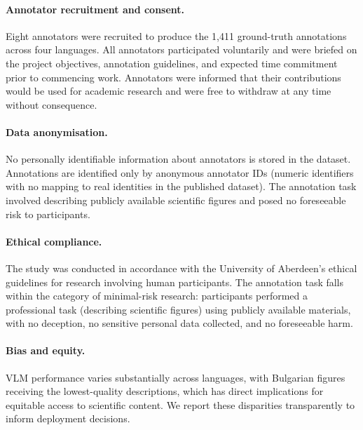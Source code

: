 \paragraph{Annotator recruitment and consent.}
Eight annotators were recruited to produce the 1,411 ground-truth annotations across four languages. All annotators participated voluntarily and were briefed on the project objectives, annotation guidelines, and expected time commitment prior to commencing work. Annotators were informed that their contributions would be used for academic research and were free to withdraw at any time without consequence.

\paragraph{Data anonymisation.}
No personally identifiable information about annotators is stored in the dataset. Annotations are identified only by anonymous annotator IDs (numeric identifiers with no mapping to real identities in the published dataset). The annotation task involved describing publicly available scientific figures and posed no foreseeable risk to participants.

\paragraph{Ethical compliance.}
The study was conducted in accordance with the University of Aberdeen's ethical guidelines for research involving human participants. The annotation task falls within the category of minimal-risk research: participants performed a professional task (describing scientific figures) using publicly available materials, with no deception, no sensitive personal data collected, and no foreseeable harm.

\paragraph{Bias and equity.}
VLM performance varies substantially across languages, with Bulgarian figures receiving the lowest-quality descriptions, which has direct implications for equitable access to scientific content. We report these disparities transparently to inform deployment decisions.

